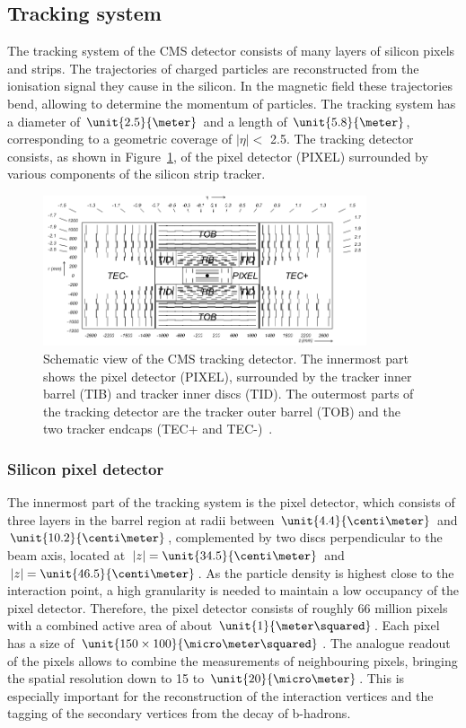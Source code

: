 \subsection{Tracking system}
The tracking system of the CMS detector consists of many layers of silicon pixels and strips. The trajectories of charged particles are reconstructed from the ionisation signal they cause in the silicon. In the magnetic field these trajectories bend, allowing to determine the momentum of particles. The tracking system has a diameter of $\unit{2.5}{\meter}$ and a length of $\unit{5.8}{\meter}$, corresponding to a geometric coverage of $\vert \eta \vert < $ 2.5. The tracking detector consists, as shown in Figure~\ref{fig:tracker}, of the pixel detector (PIXEL) surrounded by various components of  the silicon strip tracker. 
\begin{figure}[htbp]
\centering
  \includegraphics[width=0.85\textwidth]{plots/CMS/Tracker.png}
\caption{Schematic view of the CMS tracking detector. The innermost part shows the pixel detector (PIXEL), surrounded by the tracker inner barrel (TIB) and tracker inner discs (TID). The outermost parts of the tracking detector are the tracker outer barrel (TOB) and the two tracker endcaps (TEC+ and TEC-)~\cite{CMS}.}
\label{fig:tracker}
\end{figure} 
\subsubsection*{Silicon pixel detector}
The innermost part of the tracking system is the pixel detector, which consists of three layers in the barrel region at radii between $\unit{4.4}{\centi\meter}$ and $\unit{10.2}{\centi\meter}$, complemented by two discs perpendicular to the beam axis, located at $\vert z \vert = \unit{34.5}{\centi\meter}$ and  $\vert z \vert = \unit{46.5}{\centi\meter}$. As the particle density is highest close to the interaction point, a high granularity is needed to maintain a low occupancy of the pixel detector. Therefore, the pixel detector consists of roughly 66 million pixels with a combined active area of about $\unit{1}{\meter\squared}$. Each pixel has a size of $\unit{150\times100}{\micro\meter\squared}$. The analogue readout of the pixels allows to combine the measurements of neighbouring pixels, bringing the spatial resolution down to 15 to $\unit{20}{\micro\meter}$. This is especially important for the reconstruction of the interaction vertices and the tagging of the secondary vertices from the decay of b-hadrons.
